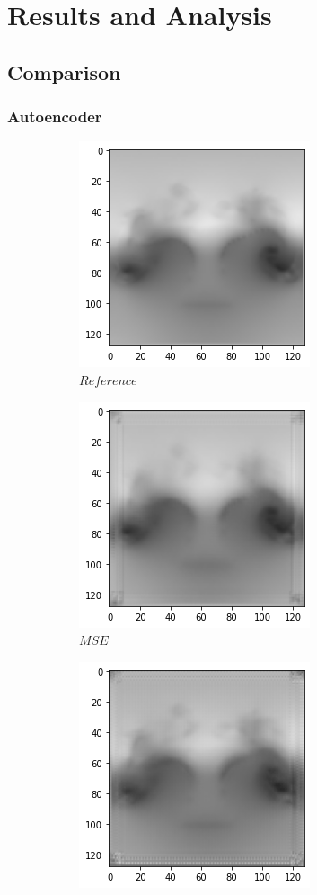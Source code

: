 \documentclass[a4paper,12pt,twoside]{report}
\begin{document}

\chapter{Results and Analysis}

\section{Comparison}
\subsection{Autoencoder}

\begin{figure}
	\centering
	\begin{subfigure}{0.19\textwidth}
		\centering
		\includegraphics[scale=0.29]{autoencoder/ref1.png}
		\caption{$Reference$}
	\end{subfigure}
	\begin{subfigure}{0.19\textwidth}
		\centering
		\includegraphics[scale=0.29]{autoencoder/mse1.png}
		\caption{$MSE$}
	\end{subfigure}
	\begin{subfigure}{0.19\textwidth}
		\centering
		\includegraphics[scale=0.29]{autoencoder/lsim1.png}

\end{subfigure}
\end{figure}
\end{document}

